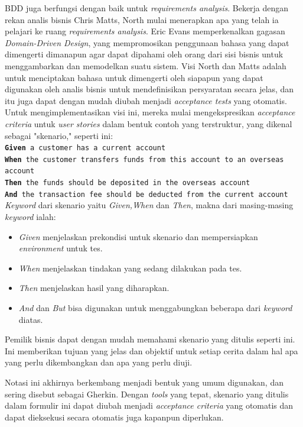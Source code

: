 \documentclass[a4paper,twoside]{article}
\begin{document}
\begin{enumerate}
BDD juga berfungsi dengan baik untuk \textit{requirements analysis}. Bekerja dengan rekan analis bisnis Chris Matts, North mulai menerapkan apa yang telah ia pelajari ke ruang \textit{requirements analysis}. Eric Evans memperkenalkan gagasan \textit{Domain-Driven Design}, yang mempromosikan penggunaan bahasa yang dapat dimengerti dimanapun agar dapat dipahami oleh  orang dari sisi bisnis untuk menggambarkan dan memodelkan suatu sistem. Visi North dan Matts adalah untuk menciptakan bahasa untuk dimengerti oleh siapapun yang dapat digunakan oleh analis bisnis untuk mendefinisikan persyaratan secara jelas, dan itu juga dapat dengan mudah diubah menjadi \textit{acceptance tests} yang otomatis. Untuk mengimplementasikan visi ini, mereka mulai mengekspresikan \textit{acceptance criteria} untuk \textit{user stories} dalam bentuk contoh yang terstruktur, yang dikenal sebagai "skenario," seperti ini:\\
\texttt{\textbf{Given} a customer has a current account \\
\textbf{When} the customer transfers funds from this account to an overseas account\\
\textbf{Then} the funds should be deposited in the overseas account\\
\textbf{And} the transaction fee should be deducted from the current account\\}
\textit{Keyword} dari skenario yaitu \textit{Given,When} dan \textit{Then}, makna dari masing-masing \textit{keyword} ialah: 
\begin{itemize}
 \item \textit{Given} menjelaskan prekondisi untuk skenario dan mempersiapkan \textit{environment} untuk tes.
 \item \textit{When} menjelaskan tindakan yang sedang dilakukan pada tes.
 \item \textit{Then} menjelaskan hasil yang diharapkan.
 \item \textit{And} dan \textit{But} bisa digunakan untuk menggabungkan beberapa dari \textit{keyword} diatas.
\end{itemize}

Pemilik bisnis dapat dengan mudah memahami skenario yang ditulis seperti ini. Ini memberikan tujuan yang jelas dan objektif untuk setiap cerita dalam hal apa yang perlu dikembangkan dan apa yang perlu diuji.

Notasi ini akhirnya berkembang menjadi bentuk yang umum digunakan, dan sering disebut sebagai Gherkin. Dengan \textit{tools} yang tepat, skenario yang ditulis dalam formulir ini dapat diubah menjadi \textit{acceptance criteria} yang otomatis dan dapat dieksekusi secara otomatis juga kapanpun diperlukan. 


\end{enumerate}
\end{document}
